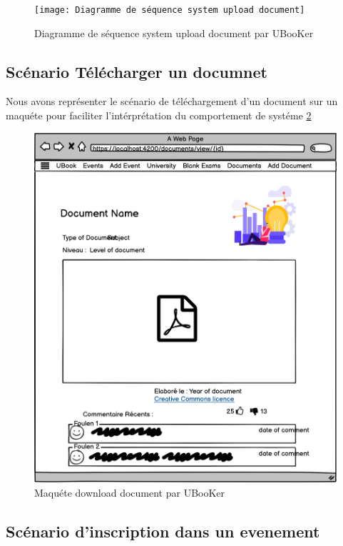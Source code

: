 \documentclass[12pt]{report}
\begin{document}
\begin{figure}[hbtp]
    \centering
    \texttt{[image: Diagramme de séquence system upload document]}
    \caption{Diagramme de séquence system upload document par UBooKer}
    \label{fig:diagrammedeséquencesystemuploaddocumentparubooker}
\end{figure}
\newpage
\subsection{Scénario Télécharger un documnet}
Nous avons représenter le scénario de téléchargement d'un document sur un maquéte pour faciliter l'intérprétation du comportement de systéme \ref{fig:diagrammedesséquencesystemdownloaddocumentparUbooker}

\begin{figure}[!hbtp]
    \centering
    \includegraphics[width=.88\textwidth]{Consulter un document}
    \caption{Maquéte download document par UBooKer}
    \label{fig:diagrammedesséquencesystemdownloaddocumentparUbooker}
\end{figure}
\newpage

\subsection{Scénario d'inscription dans un evenement}
\end{document}
